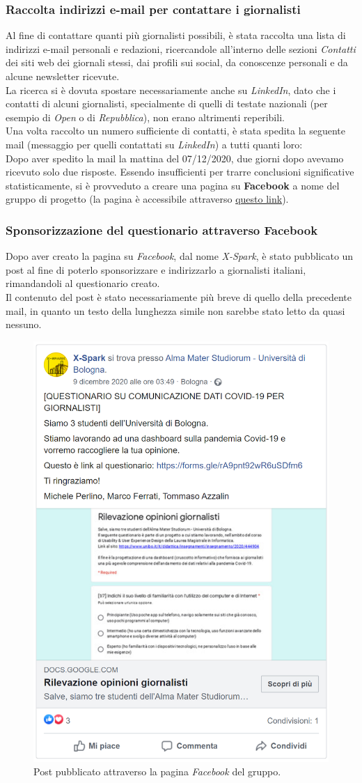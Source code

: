 \subsubsection{Raccolta indirizzi e-mail per contattare i giornalisti}{}
Al fine di contattare quanti più giornalisti possibili, è stata raccolta una lista di indirizzi e-mail personali e redazioni, ricercandole all'interno delle sezioni \textit{Contatti} dei siti web dei giornali stessi, dai profili sui social, da conoscenze personali e da alcune newsletter ricevute.\\
La ricerca si è dovuta spostare necessariamente anche su \textit{LinkedIn}, dato che i contatti di alcuni giornalisti, specialmente di quelli di testate nazionali (per esempio di \textit{Open} o di \textit{Repubblica}), non erano altrimenti reperibili.\\
Una volta raccolto un numero sufficiente di contatti, è stata spedita la seguente mail (messaggio per quelli contattati su \textit{LinkedIn}) a tutti quanti loro:\\

Dopo aver spedito la mail la mattina del 07/12/2020, due giorni dopo avevamo ricevuto solo due risposte.
Essendo insufficienti per trarre conclusioni significative statisticamente, si è provveduto a creare una pagina su \textbf{Facebook} a nome del gruppo di progetto (la pagina è accessibile attraverso \href{https://www.facebook.com/XSparkUnibo}{questo link}).

\subsubsection{Sponsorizzazione del questionario attraverso Facebook}
Dopo aver creato la pagina su \textit{Facebook}, dal nome \textit{X-Spark}, è stato pubblicato un post al fine di poterlo sponsorizzare e indirizzarlo a giornalisti italiani, rimandandoli al questionario creato.\\
Il contenuto del post è stato necessariamente più breve di quello della precedente mail, in quanto un testo della lunghezza simile non sarebbe stato letto da quasi nessuno.

\begin{figure}[!h] 
    \centering 
    \includegraphics[width=0.4\columnwidth]{assets/images/ricerca-etnografica/post-facebook} 
    \caption{Post pubblicato attraverso la pagina \textit{Facebook} del gruppo.}
\end{figure}

